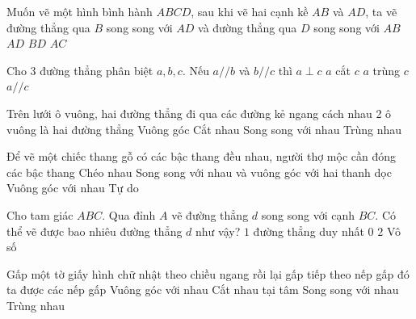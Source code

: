 \begin{ex} %
Muốn vẽ một hình bình hành $ABCD$, sau khi vẽ hai cạnh kề $AB$ và $AD$, ta vẽ đường thẳng qua $B$ song song với $AD$ và đường thẳng qua $D$ song song với
\choice
{\True $AB$}
{$AD$}
{$BD$}
{$AC$}
\end{ex}

\begin{ex} %
Cho 3 đường thẳng phân biệt $a, b, c$. Nếu $a // b$ và $b // c$ thì
\choice
{$a \perp c$}
{$a$ cắt $c$}
{$a$ trùng $c$}
{\True $a // c$}
\end{ex}

\begin{ex} %
Trên lưới ô vuông, hai đường thẳng đi qua các đường kẻ ngang cách nhau 2 ô vuông là hai đường thẳng
\choice
{Vuông góc}
{Cắt nhau}
{\True Song song với nhau}
{Trùng nhau}
\end{ex}

\begin{ex} %
Để vẽ một chiếc thang gỗ có các bậc thang đều nhau, người thợ mộc cần đóng các bậc thang
\choice
{Chéo nhau}
{\True Song song với nhau và vuông góc với hai thanh dọc}
{Vuông góc với nhau}
{Tự do}
\end{ex}

\begin{ex} %
Cho tam giác $ABC$. Qua đỉnh $A$ vẽ đường thẳng $d$ song song với cạnh $BC$. Có thể vẽ được bao nhiêu đường thẳng $d$ như vậy?
\choice
{\True $1$ đường thẳng duy nhất}
{$0$}
{$2$}
{Vô số}
\end{ex}

\begin{ex} %
Gấp một tờ giấy hình chữ nhật theo chiều ngang rồi lại gấp tiếp theo nếp gấp đó ta được các nếp gấp
\choice
{Vuông góc với nhau}
{Cắt nhau tại tâm}
{\True Song song với nhau}
{Trùng nhau}
\end{ex}

